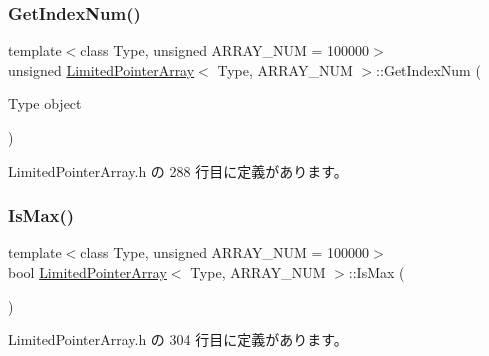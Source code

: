 \subsubsection{\texorpdfstring{Get\+Index\+Num()}{GetIndexNum()}}
{\footnotesize\ttfamily template$<$class Type, unsigned A\+R\+R\+A\+Y\+\_\+\+N\+UM = 100000$>$ \\
unsigned \mbox{\hyperlink{class_limited_pointer_array}{Limited\+Pointer\+Array}}$<$ Type, A\+R\+R\+A\+Y\+\_\+\+N\+UM $>$\+::Get\+Index\+Num (\begin{DoxyParamCaption}\item[{Type}]{object }\end{DoxyParamCaption})\hspace{0.3cm}{\ttfamily [inline]}}



 Limited\+Pointer\+Array.\+h の 288 行目に定義があります。

\mbox{\label{class_limited_pointer_array_a8bd3a7ea969f307c35934a1bf2803b40}} 
\subsubsection{\texorpdfstring{Is\+Max()}{IsMax()}}
{\footnotesize\ttfamily template$<$class Type, unsigned A\+R\+R\+A\+Y\+\_\+\+N\+UM = 100000$>$ \\
bool \mbox{\hyperlink{class_limited_pointer_array}{Limited\+Pointer\+Array}}$<$ Type, A\+R\+R\+A\+Y\+\_\+\+N\+UM $>$\+::Is\+Max (\begin{DoxyParamCaption}{ }\end{DoxyParamCaption})\hspace{0.3cm}{\ttfamily [inline]}}



 Limited\+Pointer\+Array.\+h の 304 行目に定義があります。

\mbox{\label{class_limited_pointer_array_a7cf64a1731ab6d0d63182b6c223fae0b}} 
